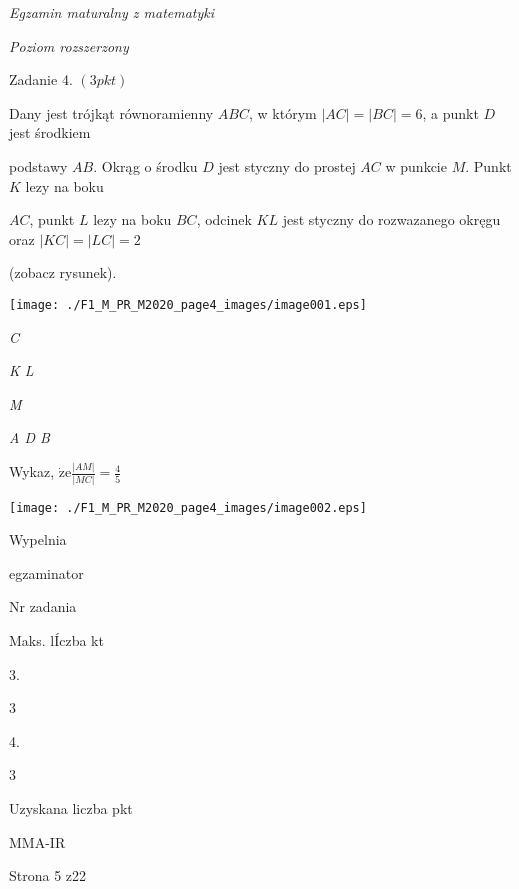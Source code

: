 \documentclass[a4paper,12pt]{article}
\begin{document}
{\it Egzamin maturalny z matematyki}

{\it Poziom rozszerzony}

Zadanie 4. $(3pkt)$

Dany jest trójkąt równoramienny $ABC$, w którym $|AC|=|BC|=6$, a punkt $D$ jest środkiem

podstawy $AB$. Okrąg o środku $D$ jest styczny do prostej $AC$ w punkcie $M$. Punkt $K$ lezy na boku

$AC$, punkt $L$ lezy na boku $BC$, odcinek $KL$ jest styczny do rozwazanego okręgu oraz $|KC|=|LC|=2$

(zobacz rysunek).
\begin{center}
\texttt{[image: ./F1\_M\_PR\_M2020\_page4\_images/image001.eps]}
\end{center}
{\it C}

{\it K  L}

{\it M}

{\it A  D  B}

Wykaz, $\displaystyle \dot{\mathrm{z}}\mathrm{e}\frac{|AM|}{|MC|}=\frac{4}{5}$
\begin{center}
\texttt{[image: ./F1\_M\_PR\_M2020\_page4\_images/image002.eps]}
\end{center}
Wypelnia

egzaminator

Nr zadania

Maks. lÍczba kt

3.

3

4.

3

Uzyskana liczba pkt

MMA-IR

Strona 5 z22
\end{document}
